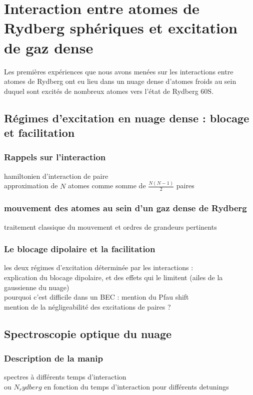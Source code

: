 \chapter{Interaction entre atomes de Rydberg sphériques et excitation de gaz dense}
\label{chapter:60s}
\noindent Les premières expériences que nous avons menées sur les interactions entre atomes de Rydberg ont eu lieu dans un nuage dense d'atomes froids au sein duquel sont excités de nombreux atomes vers l'état de Rydberg $\mathrm{60S}$.


\section{Régimes d'excitation en nuage dense : blocage et facilitation}
	\subsection{Rappels sur l'interaction}
		\noindent hamiltonien d'interaction de paire \\
		approximation de $N$ atomes comme somme de $\frac{N(N-1)}{2}$ paires
	\subsection{mouvement des atomes au sein d'un gaz dense de Rydberg}
		\noindent  traitement classique du mouvement et ordres de grandeurs pertinents
	\subsection{Le blocage dipolaire et la facilitation}
		\noindent les deux régimes d'excitation déterminée par les interactions :\\
		explication du blocage dipolaire, et des effets qui le limitent (ailes de la gaussienne du nuage) \\
		pourquoi c'est difficile dans un BEC : mention du Pfau shift \\
		mention de la négligeabilité des excitations de paires ?

\section{Spectroscopie optique du nuage}
	\subsection{Description de la manip}
		\noindent spectres à différents temps d'interaction\\
		ou $N_rydberg$ en fonction du temps d'interaction pour différents detunings
		
